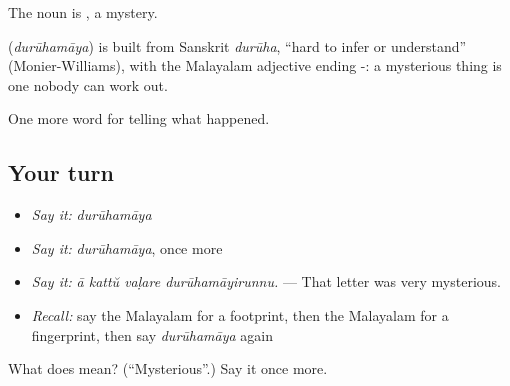 The noun is , a mystery.

\begin{cousinweb}
\textbf{} (\emph{durūhamāya}) is built from Sanskrit \emph{durūha}, \textquotedblleft{}hard to infer or understand\textquotedblright{} (Monier-Williams), with the Malayalam adjective ending -: a mysterious thing is one nobody can work out.
\end{cousinweb}

\begin{grammarlens}[title={What you've built}]
One more word for telling what happened.
\end{grammarlens}

\subsection*{Your turn}
\begin{itemize}
\raggedright
  \item \emph{Say it:} \emph{durūhamāya}
  \item \emph{Say it:} \emph{durūhamāya}, once more
  \item \emph{Say it:} \emph{ā kattŭ vaḷare durūhamāyirunnu.} — That letter was very mysterious.
  \item \emph{Recall:} say the Malayalam for a footprint, then the Malayalam for a fingerprint, then say \emph{durūhamāya} again
\end{itemize}

\begin{tcolorbox}[breakable,colback=teal!4,colframe=teal!35!black,title={Before you move on}]
What does  mean? (\textquotedblleft{}Mysterious\textquotedblright{}.) Say it once more.
\end{tcolorbox}
